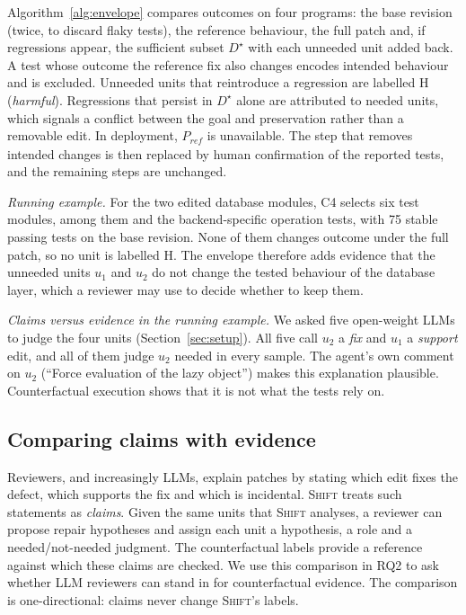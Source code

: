 \documentclass[a4paper,fleqn]{cas-sc}
\newcommand{\tool}{\textsc{Shift}}
\newcommand{\code}[1]{\texttt{\detokenize{#1}}}
\newcommand{\lab}[1]{\textsf{#1}}
\begin{document}
Algorithm~\ref{alg:envelope} compares outcomes on four programs: the base revision (twice, to discard flaky tests), the reference behaviour, the full patch and, if regressions appear, the sufficient subset $D^\star$ with each unneeded unit added back. A test whose outcome the reference fix also changes encodes intended behaviour and is excluded. Unneeded units that reintroduce a regression are labelled \lab{H} (\emph{harmful}). Regressions that persist in $D^\star$ alone are attributed to needed units, which signals a conflict between the goal and preservation rather than a removable edit. In deployment, $P_{\mathit{ref}}$ is unavailable. The step that removes intended changes is then replaced by human confirmation of the reported tests, and the remaining steps are unchanged.

\emph{Running example.} For the two edited database modules, C4 selects six test modules, among them \code{backends.base.test_operations} and the backend-specific operation tests, with 75 stable passing tests on the base revision. None of them changes outcome under the full patch, so no unit is labelled \lab{H}. The envelope therefore adds evidence that the unneeded units $u_1$ and $u_2$ do not change the tested behaviour of the database layer, which a reviewer may use to decide whether to keep them.

\emph{Claims versus evidence in the running example.} We asked five open-weight LLMs to judge the four units (Section~\ref{sec:setup}). All five call $u_2$ a \emph{fix} and $u_1$ a \emph{support} edit, and all of them judge $u_2$ needed in every sample. The agent's own comment on $u_2$ (``Force evaluation of the lazy object'') makes this explanation plausible. Counterfactual execution shows that it is not what the tests rely on.


\subsection{Comparing claims with evidence}\label{sec:claims}
Reviewers, and increasingly LLMs, explain patches by stating which edit fixes the defect, which supports the fix and which is incidental. \tool{} treats such statements as \emph{claims}. Given the same units that \tool{} analyses, a reviewer can propose repair hypotheses and assign each unit a hypothesis, a role and a needed/not-needed judgment. The counterfactual labels provide a reference against which these claims are checked. We use this comparison in RQ2 to ask whether LLM reviewers can stand in for counterfactual evidence. The comparison is one-directional: claims never change \tool{}'s labels.
\end{document}
